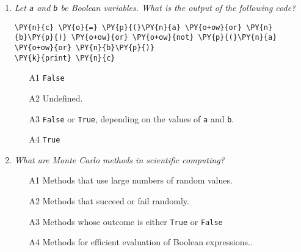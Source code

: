 \begin{enumerate}
\begin{Verbatim}[commandchars=\\\{\}]
\PY{n}{n} \PY{o}{=} \PY{l+m+mi}{10} \PY{o}{+} \PY{l+m+mi}{5}
\PY{n}{m} \PY{o}{=} \PY{l+m+mi}{4} \PY{o}{*} \PY{l+m+mi}{5}
\PY{n}{var} \PY{o}{=} \PY{n}{n} \PY{o}{==} \PY{n}{m}
\end{Verbatim}
\vspace{6mm}

\begin{enumerate}
\item[A1] {\tt 15}
\item[A2] {\tt 20}
\item[A3] {\tt False}
\item[A4] {\tt True}
\end{enumerate}

\vspace{6mm}

\item {\em Let {\tt a} and {\tt b} be Boolean variables. What is the 
output of the following code?}\\

\begin{Verbatim}[commandchars=\\\{\}]
\PY{n}{c} \PY{o}{=} \PY{p}{(}\PY{n}{a} \PY{o+ow}{or} \PY{n}{b}\PY{p}{)} \PY{o+ow}{or} \PY{o+ow}{not} \PY{p}{(}\PY{n}{a} \PY{o+ow}{or} \PY{n}{b}\PY{p}{)}
\PY{k}{print} \PY{n}{c}
\end{Verbatim}
\vspace{6mm}

\begin{enumerate}
\item[A1] {\tt False}
\item[A2] Undefined.
\item[A3] {\tt False} or {\tt True}, depending on the values of {\tt a} and {\tt b}.
\item[A4] {\tt True}
\end{enumerate}

\vspace{6mm}

\item {\em What are Monte Carlo methods in scientific computing?}\\

\begin{enumerate}
\item[A1] Methods that use large numbers of random values.
\item[A2] Methods that succeed or fail randomly.
\item[A3] Methods whose outcome is either {\tt True} or {\tt False}
\item[A4] Methods for efficient evaluation of Boolean expressions..
\end{enumerate}


\end{enumerate}
